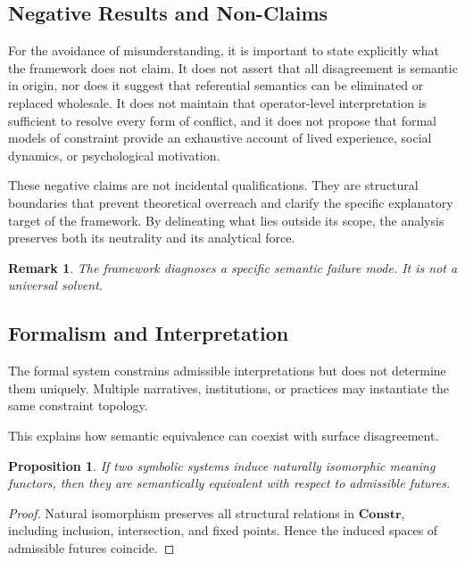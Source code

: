 \documentclass[11pt]{article}
\newtheorem{proposition}{Proposition}
\newtheorem{remark}{Remark}
\begin{document}
\subsection{Negative Results and Non-Claims}

For the avoidance of misunderstanding, it is important to state explicitly what
the framework does not claim. It does not assert that all disagreement is semantic
in origin, nor does it suggest that referential semantics can be eliminated or
replaced wholesale. It does not maintain that operator-level interpretation is
sufficient to resolve every form of conflict, and it does not propose that formal
models of constraint provide an exhaustive account of lived experience, social
dynamics, or psychological motivation.

These negative claims are not incidental qualifications. They are structural
boundaries that prevent theoretical overreach and clarify the specific explanatory
target of the framework. By delineating what lies outside its scope, the analysis
preserves both its neutrality and its analytical force.

\begin{remark}
The framework diagnoses a specific semantic failure mode. It is not a universal
solvent.
\end{remark}

\subsection{Formalism and Interpretation}

The formal system constrains admissible interpretations but does not determine
them uniquely. Multiple narratives, institutions, or practices may instantiate
the same constraint topology.

This explains how semantic equivalence can coexist with surface disagreement.

\begin{proposition}
If two symbolic systems induce naturally isomorphic meaning functors, then they
are semantically equivalent with respect to admissible futures.
\end{proposition}

\begin{proof}
Natural isomorphism preserves all structural relations in $\mathbf{Constr}$,
including inclusion, intersection, and fixed points. Hence the induced spaces of
admissible futures coincide.
\end{proof}
\end{document}
